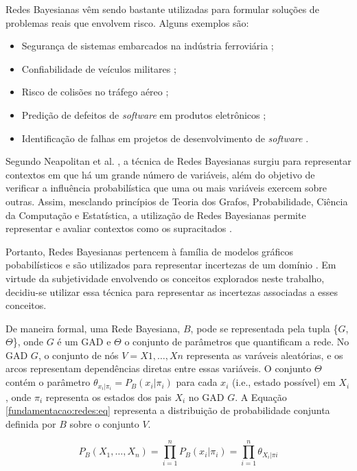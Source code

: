 Redes Bayesianas vêm sendo bastante utilizadas para formular soluções de problemas reais que envolvem risco. Alguns exemplos são:

\begin{itemize}
  \item Segurança de sistemas embarcados na indústria ferroviária \cite{neil};
  \item Confiabilidade de veículos militares \cite{neil2};
  \item Risco de colisões no tráfego aéreo \cite{neil3};
  \item Predição de defeitos de \textit{software} em produtos eletrônicos \cite{neil4} \cite{fenton2} \cite{fenton3} \cite{fenton4};
  \item Identificação de falhas em projetos de desenvolvimento de \textit{software} \cite{perkusich2013} \cite{perkusich2014}.
\end{itemize}

Segundo Neapolitan et al. \cite{neapolitan}, a técnica de Redes Bayesianas surgiu para representar contextos em que há um grande número de variáveis, além do objetivo de verificar a influência probabilística que uma ou mais variáveis exercem sobre outras. Assim, mesclando princípios de Teoria dos Grafos, Probabilidade, Ciência da Computação e Estatística, a utilização de Redes Bayesianas permite representar e avaliar contextos como os supracitados \cite{bengal}.

Portanto, Redes Bayesianas pertencem à família de modelos gráficos pobabilísticos e são utilizados para representar incertezas de um domínio \cite{bengal}. Em virtude da subjetividade envolvendo os conceitos explorados neste trabalho, decidiu-se utilizar essa técnica para representar as incertezas associadas a esses conceitos.

De maneira formal, uma Rede Bayesiana, $B$, pode se representada pela tupla \{$G$, $\Theta$\}, onde $G$ é um GAD e $\Theta$ o conjunto de parâmetros que quantificam a rede. No GAD $G$, o conjunto de nós $V = X1, \ldots,Xn$ representa as varáveis aleatórias, e os arcos representam dependências diretas entre essas variáveis. O conjunto $\Theta$ contém o parâmetro $\theta_{x_{i}|\pi_{i}} = P_{B}(x_{i}|\pi_{i})$ para cada $x_{i}$ (i.e., estado possível) em $X_{i}$, onde $\pi_{i}$ representa os estados dos pais $X_{i}$ no GAD $G$. A Equação \ref{fundamentacao:redes:eq} representa a distribuição de probabilidade conjunta definida por $B$ sobre o conjunto $V$.

\begin{equation}\label{fundamentacao:redes:eq}
  P_{B}(X_{1}, \ldots, X_{n}) = \prod\limits_{i=1}^n P_{B}(x_{i}|\pi_{i}) = \prod\limits_{i=1}^n \theta_{X_{i}|\pi{i}}
\end{equation}

